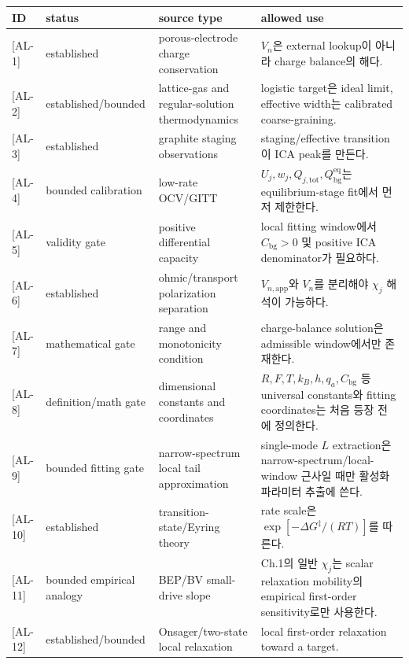 \documentclass[11pt,a4paper]{article}
\newcommand{\eq}{\mathrm{eq}}
\newcommand{\app}{\mathrm{app}}
\newcommand{\bg}{\mathrm{bg}}
\newcommand{\tot}{\mathrm{tot}}
\newcommand{\AL}[1]{\textsf{[AL-#1]}}
\begin{document}
\begin{longtable}{p{} p{} p{} p{}}
\toprule ID & status & source type & allowed use \\ \midrule \endhead
\AL{1} & established & porous-electrode charge conservation \cite{doyle1993,newman} & $V_n$은 external lookup이 아니라 charge balance의 해다. \\
\AL{2} & established/bounded & lattice-gas and regular-solution thermodynamics \cite{mckinnon1983,bazant2013} & logistic target은 ideal limit, effective width는 calibrated coarse-graining. \\
\AL{3} & established & graphite staging observations \cite{dahn1991,ohzuku1993,funabiki1999ea,funabiki1999jes} & staging/effective transition이 ICA peak를 만든다. \\
\AL{4} & bounded calibration & low-rate OCV/GITT & $U_j,w_j,Q_{j,\tot},Q_{\bg}^{\eq}$는 equilibrium-stage fit에서 먼저 제한한다. \\
\AL{5} & validity gate & positive differential capacity & local fitting window에서 $C_{\bg}>0$ 및 positive ICA denominator가 필요하다. \\
\AL{6} & established & ohmic/transport polarization separation \cite{newman,bardfaulkner} & $V_{n,\app}$와 $V_n$를 분리해야 $\chi_j$ 해석이 가능하다. \\
\AL{7} & mathematical gate & range and monotonicity condition & charge-balance solution은 admissible window에서만 존재한다. \\
\AL{8} & definition/math gate & dimensional constants and coordinates & $R,F,T,k_B,h,q_a,C_\bg$ 등 universal constants와 fitting coordinates는 처음 등장 전에 정의한다. \\
\AL{9} & bounded fitting gate & narrow-spectrum local tail approximation & single-mode $L$ extraction은 narrow-spectrum/local-window 근사일 때만 활성화 파라미터 추출에 쓴다. \\
\AL{10} & established & transition-state/Eyring theory \cite{eyring1935} & rate scale은 $\exp[-\Delta G^\ddagger/(RT)]$를 따른다. \\
\AL{11} & bounded empirical analogy & BEP/BV small-drive slope \cite{evanspolanyi1938,bardfaulkner} & Ch.1의 일반 $\chi_j$는 scalar relaxation mobility의 empirical first-order sensitivity로만 사용한다. \\
\AL{12} & established/bounded & Onsager/two-state local relaxation \cite{onsager1931,degrootmazur1962} & local first-order relaxation toward a target. \\

\end{longtable}
\end{document}
